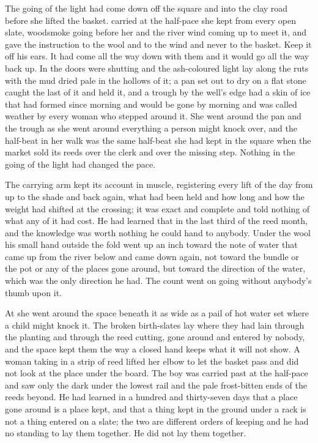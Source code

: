 The going of the light had come down off the square and into the clay road before she lifted the basket.  carried  at the half-pace she kept from every open slate, woodsmoke going before her and the river wind coming up to meet it, and gave the instruction to the wool and to the wind and never to the basket. Keep it off his ears. It had come all the way down with them and it would go all the way back up. In  the doors were shutting and the ash-coloured light lay along the ruts with the mud dried pale in the hollows of it; a pan set out to dry on a flat stone caught the last of it and held it, and a trough by the well's edge had a skin of ice that had formed since morning and would be gone by morning and was called weather by every woman who stepped around it. She went around the pan and the trough as she went around everything a person might knock over, and the half-beat in her walk was the same half-beat she had kept in the square when the market sold its reeds over the clerk and over the missing step. Nothing in the going of the light had changed the pace.

The carrying arm kept its account in muscle, registering every lift of the day from  up to the shade and back again, what had been held and how long and how the weight had shifted at the crossing; it was exact and complete and told nothing of what any of it had cost. He had learned that in the last third of the reed month, and the knowledge was worth nothing he could hand to anybody. Under the wool his small hand outside the fold went up an inch toward the note of water that came up from the river below and came down again, not toward the bundle or the pot or any of the places gone around, but toward the direction of the water, which was the only direction he had. The count went on going without anybody's thumb upon it.

At  she went around the space beneath it as wide as a pail of hot water set where a child might knock it. The broken birth-slates lay where they had lain through the planting and through the reed cutting, gone around and entered by nobody, and the space kept them the way a closed hand keeps what it will not show. A woman taking in a strip of reed lifted her elbow to let the basket pass and did not look at the place under the board. The boy was carried past at the half-pace and saw only the dark under the lowest rail and the pale frost-bitten ends of the reeds beyond. He had learned in a hundred and thirty-seven days that a place gone around is a place kept, and that a thing kept in the ground under a rack is not a thing entered on a slate; the two are different orders of keeping and he had no standing to lay them together. He did not lay them together.

